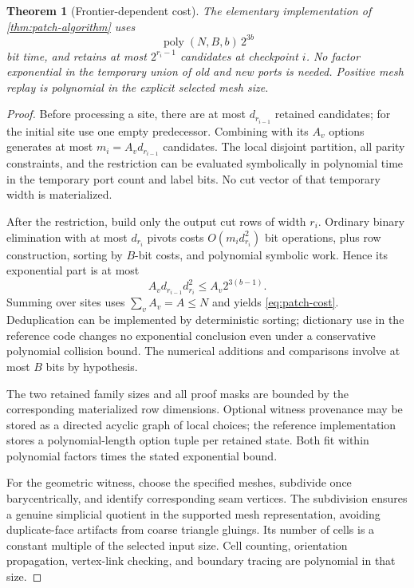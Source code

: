 \documentclass[11pt,letterpaper]{article}
\newtheorem{theorem}{Theorem}[section]
\theoremstyle{definition}
\newcommand{\poly}{\operatorname{poly}}
\begin{document}
\begin{theorem}[Frontier-dependent cost]\label{thm:patch-cost}
The elementary implementation of \cref{thm:patch-algorithm} uses
\begin{equation}\label{eq:patch-cost}
 \poly(N,B,b)\,2^{3b}
\end{equation}
bit time, and retains at most $2^{r_i-1}$ candidates at checkpoint $i$. No factor exponential in the temporary union of old and new ports is needed. Positive mesh replay is polynomial in the explicit selected mesh size.
\end{theorem}
\begin{proof}
Before processing a site, there are at most $d_{r_{i-1}}$ retained candidates; for the initial site use one empty predecessor. Combining with its $A_v$ options generates at most $m_i=A_v d_{r_{i-1}}$ candidates. The local disjoint partition, all parity constraints, and the restriction can be evaluated symbolically in polynomial time in the temporary port count and label bits. No cut vector of that temporary width is materialized.

After the restriction, build only the output cut rows of width $r_i$. Ordinary binary elimination with at most $d_{r_i}$ pivots costs $O(m_i d_{r_i}^2)$ bit operations, plus row construction, sorting by $B$-bit costs, and polynomial symbolic work. Hence its exponential part is at most
\[
 A_v d_{r_{i-1}}d_{r_i}^2\le A_v 2^{3(b-1)}.
\]
Summing over sites uses $\sum_v A_v=A\le N$ and yields \eqref{eq:patch-cost}. Deduplication can be implemented by deterministic sorting; dictionary use in the reference code changes no exponential conclusion even under a conservative polynomial collision bound. The numerical additions and comparisons involve at most $B$ bits by hypothesis.

The two retained family sizes and all proof masks are bounded by the corresponding materialized row dimensions. Optional witness provenance may be stored as a directed acyclic graph of local choices; the reference implementation stores a polynomial-length option tuple per retained state. Both fit within polynomial factors times the stated exponential bound.

For the geometric witness, choose the specified meshes, subdivide once barycentrically, and identify corresponding seam vertices. The subdivision ensures a genuine simplicial quotient in the supported mesh representation, avoiding duplicate-face artifacts from coarse triangle gluings. Its number of cells is a constant multiple of the selected input size. Cell counting, orientation propagation, vertex-link checking, and boundary tracing are polynomial in that size.
\end{proof}
\end{document}
